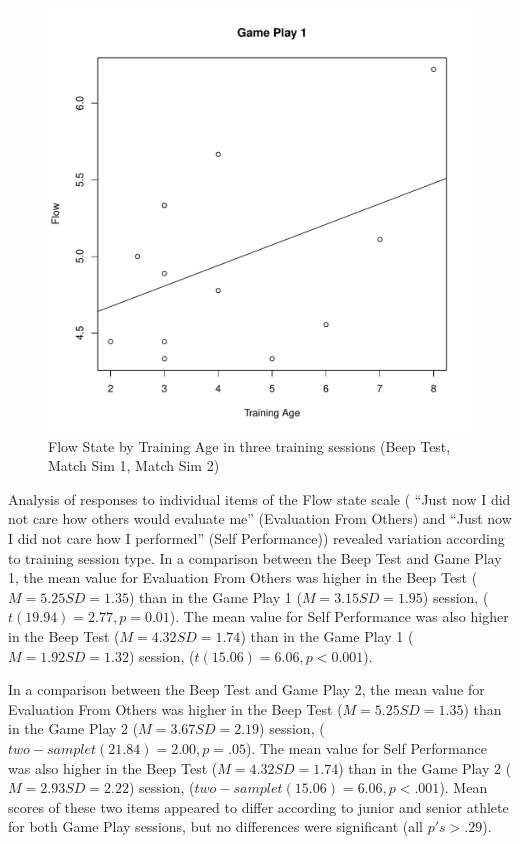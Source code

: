 \begin{CJK}{UTF8}{gbsn}
\begin{figure}[htbp]
\includegraphics[scale=.2]{images/flow0109TrainingAge.pdf}
  \caption{Flow State by Training Age in three training sessions (Beep Test, Match Sim 1, Match Sim 2)}
  \label{fig:flowTrainingAge}
\end{figure}

Analysis of responses to individual items of the Flow state scale ( ``Just now I did not care how others would evaluate me'' (Evaluation From Others) and ``Just now I did not care how I performed'' (Self Performance)) revealed variation according to training session type.  In a comparison between the Beep Test and Game Play 1, the mean value for Evaluation From Others was higher in the Beep Test ($M = 5.25 SD = 1.35$) than in the Game Play 1 ($M = 3.15 SD = 1.95$) session, ($t(19.94) = 2.77, p = 0.01$).  The mean value for Self Performance was also higher in the Beep Test ($M = 4.32 SD = 1.74$) than in the Game Play 1 ($M = 1.92 SD = 1.32$) session, ($t(15.06) = 6.06, p < 0.001$).

In a comparison between the Beep Test and Game Play 2, the mean value for Evaluation From Others was higher in the Beep Test ($M = 5.25 SD = 1.35$) than in the Game Play 2 ($M = 3.67 SD = 2.19$) session, ($two-sample t(21.84) = 2.00, p = .05$).   The mean value for Self Performance was also higher in the Beep Test ($M = 4.32 SD = 1.74$) than in the Game Play 2 ($M = 2.93 SD = 2.22$) session, ($two-sample t(15.06) = 6.06, p < .001$).  Mean scores of these two items appeared to differ according to junior and senior athlete for both Game Play sessions, but no differences were significant (all $p's > .29$).


\end{CJK}
